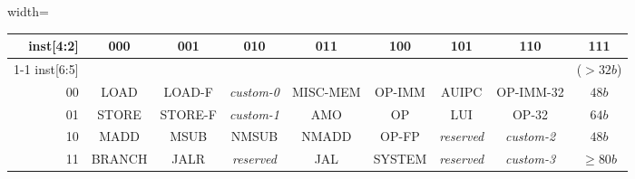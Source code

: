 \vspace{0.1in}
\newcommand{\f}[1]{\cellcolor{darkgray}\tiny{#1}}
\begin{table*}[htbp]
\begin{center}
{%
\setlength{\tabcolsep}{4pt}
\begin{adjustbox}{width=\textwidth}
\begin{tabular}{|r|c|c|c|c|c|c|c|c|}
  \hline
  inst[4:2] & 000      & 001        & 010               & 011        & 100      & 101               & 110               & \cellcolor{gray}111 \\ \cline{1-1}
  inst[6:5] &          &            &                   &            &          &                   &                   & \cellcolor{gray}($>32b$)  \\ \hline
		 00 & LOAD     & \f{LOAD-F} & \f{{\em custom-0}}&\f{MISC-MEM}& OP-IMM   & AUIPC             & \f{OP-IMM-32}     & \cellcolor{gray} $48b$\\ \hline
		 01 & STORE    & \f{STORE-F}& \f{{\em custom-1}}& \f{AMO}    & OP       & LUI               & \f{OP-32}         & \cellcolor{gray} $64b$ \\ \hline
		 10 & \f{MADD} & \f{MSUB}   & \f{NMSUB}         & \f{NMADD}  & \f{OP-FP}& \f{{\em reserved}}& \f{{\em custom-2}}& \cellcolor{gray} $48b$\\ \hline
		 11 & BRANCH   & JALR       & \f{{\em reserved}}& JAL        &\f{SYSTEM}& \f{{\em reserved}}& \f{{\em custom-3}}& \cellcolor{gray} $\geq80b$\\ \hline

 \end{tabular}
 \end{adjustbox}
}
\end{center}
\caption{RISC-V base opcode map, inst[1:0]=11}
\label{Tab:opcodemap}
\end{table*}
\let\f\undefined
